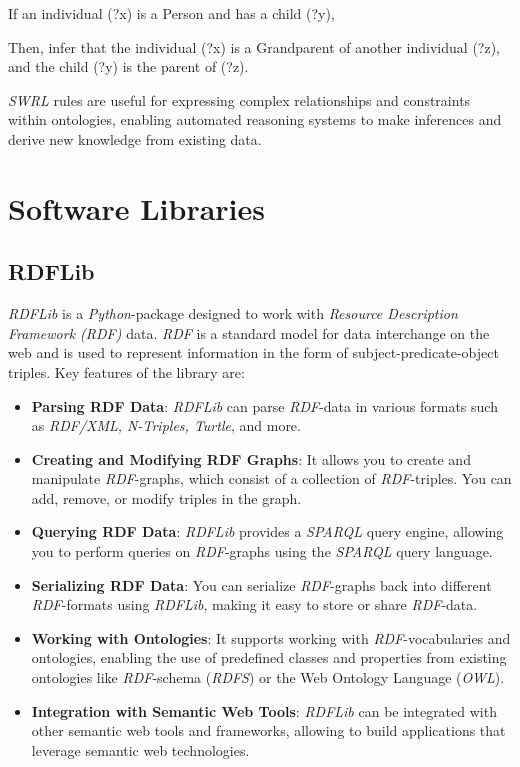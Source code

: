 	If an individual (?x) is a Person and has a child (?y),
	
	Then, infer that the individual (?x) is a Grandparent of another individual (?z), and the child (?y) is the parent of (?z).
	
	\textit{SWRL} \cite{Horrocks2004} rules are useful for expressing complex relationships and constraints within ontologies, enabling automated reasoning systems to make inferences and derive new knowledge from existing data.

	\section{Software Libraries}
\label{sec:Libraries}
\subsection{RDFLib}
\label{sec:RDFLib}
\textit{RDFLib} \cite{Krech_RDFLib_2023} is a \textit{Python}-package designed to work with \textit{Resource Description Framework (RDF)} data. \textit{RDF} is a standard model for data interchange on the web and is used to represent information in the form of subject-predicate-object triples. Key features of the library are:

\begin{itemize}
    \item \textbf{Parsing RDF Data}: \textit{RDFLib} can parse \textit{RDF}-data in various formats such as \textit{RDF/XML, N-Triples, Turtle}, and more.
    
    \item \textbf{Creating and Modifying RDF Graphs}: It allows you to create and manipulate \textit{RDF}-graphs, which consist of a collection of \textit{RDF}-triples. You can add, remove, or modify triples in the graph.
    
    \item \textbf{Querying RDF Data}: \textit{RDFLib} provides a \textit{SPARQL} query engine, allowing you to perform queries on \textit{RDF}-graphs using the \textit{SPARQL} query language.
    
    \item \textbf{Serializing RDF Data}: You can serialize \textit{RDF}-graphs back into different \textit{RDF}-formats using \textit{RDFLib}, making it easy to store or share \textit{RDF}-data.
    
    \item \textbf{Working with Ontologies}: It supports working with \textit{RDF}-vocabularies and ontologies, enabling the use of predefined classes and properties from existing ontologies like \textit{RDF}-schema (\textit{RDFS}) or the Web Ontology Language (\textit{OWL}).
    
    \item \textbf{Integration with Semantic Web Tools}: \textit{RDFLib} can be integrated with other semantic web tools and frameworks, allowing to build applications that leverage semantic web technologies.
\end{itemize}

